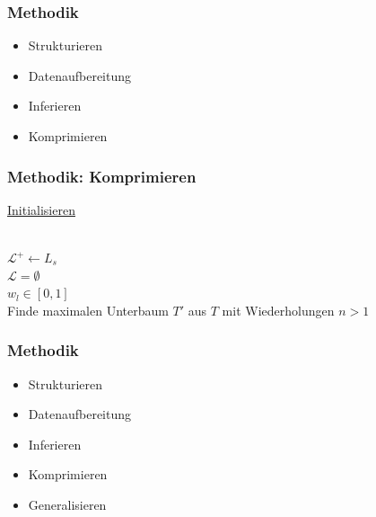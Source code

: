 \documentclass[12pt]{beamer}
\begin{document}
    \begin{frame}
        \frametitle{Methodik}

        \begin{itemize}
            \setlength\itemsep{1em}
            \item<1-> Strukturieren
            \item<1-> Datenaufbereitung
            \item<1-> Inferieren
            \item<2-> Komprimieren
        \end{itemize}
    \end{frame}

    \begin{frame}[allowframebreaks]
        \frametitle{Methodik: Komprimieren}

        \underline{Initialisieren}\\
        ~\\
        \begin{algorithm}[H]
            $\mathcal{L}^+ \leftarrow L_s$\\
            $\mathcal{L}=\emptyset$\\
            $w_l \in [0,1]$\\
            Finde maximalen Unterbaum $T'$ aus $T$ mit Wiederholungen $n>1$
        \end{algorithm}

        \framebreak

        \begin{algorithm}[H]
        \end{algorithm}
    \end{frame}

    \begin{frame}
        \frametitle{Methodik}

        \begin{itemize}
            \setlength\itemsep{1em}
            \item<1-> Strukturieren
            \item<1-> Datenaufbereitung
            \item<1-> Inferieren
            \item<1-> Komprimieren
            \item<2-> Generalisieren
        \end{itemize}
    \end{frame}
\end{document}
